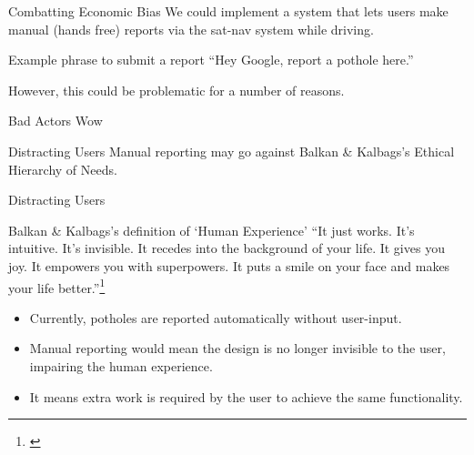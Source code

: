 \documentclass{beamer}
\begin{document}
\begin{frame}{Combatting Economic Bias}
    We could implement a system that lets users make manual (hands free) reports via the sat-nav system while driving.

    \begin{exampleblock}{Example phrase to submit a report}
        ``Hey Google, report a pothole here.''
    \end{exampleblock}

    However, this could be problematic for a number of reasons.
\end{frame}

\begin{frame}{Bad Actors}
    Wow
\end{frame}

\begin{frame}{Distracting Users}
    Manual reporting may go against Balkan \& Kalbags's Ethical Hierarchy of Needs.
\end{frame}

\begin{frame}{Distracting Users}
    \begin{block}{Balkan \& Kalbags's definition of `Human Experience'}
        ``It just works. It's intuitive. It's invisible. It recedes into the background of your life. It gives you joy. It empowers you with superpowers. It puts a smile on your face and makes your life better.''\footnote[frame]{\cite{ethical-hierarchy-of-needs}}
    \end{block}

    \begin{itemize}
        \item Currently, potholes are reported automatically without user-input.
        \item Manual reporting would mean the design is \alert{no longer invisible} to the user, \alert{impairing the human experience}.
        \item It means extra work is required by the user to achieve the same functionality.
    \end{itemize}
\end{frame}
\end{document}
